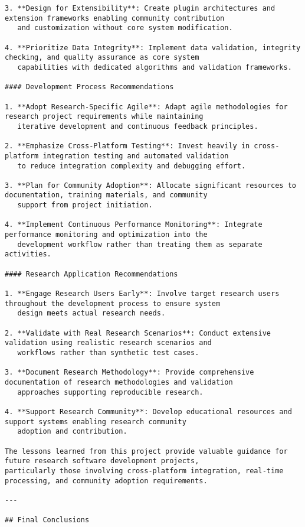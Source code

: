 \documentclass[12pt,a4paper]{report}
\begin{document}
\begin{verbatim}
3. **Design for Extensibility**: Create plugin architectures and extension frameworks enabling community contribution
   and customization without core system modification.

4. **Prioritize Data Integrity**: Implement data validation, integrity checking, and quality assurance as core system
   capabilities with dedicated algorithms and validation frameworks.

#### Development Process Recommendations

1. **Adopt Research-Specific Agile**: Adapt agile methodologies for research project requirements while maintaining
   iterative development and continuous feedback principles.

2. **Emphasize Cross-Platform Testing**: Invest heavily in cross-platform integration testing and automated validation
   to reduce integration complexity and debugging effort.

3. **Plan for Community Adoption**: Allocate significant resources to documentation, training materials, and community
   support from project initiation.

4. **Implement Continuous Performance Monitoring**: Integrate performance monitoring and optimization into the
   development workflow rather than treating them as separate activities.

#### Research Application Recommendations

1. **Engage Research Users Early**: Involve target research users throughout the development process to ensure system
   design meets actual research needs.

2. **Validate with Real Research Scenarios**: Conduct extensive validation using realistic research scenarios and
   workflows rather than synthetic test cases.

3. **Document Research Methodology**: Provide comprehensive documentation of research methodologies and validation
   approaches supporting reproducible research.

4. **Support Research Community**: Develop educational resources and support systems enabling research community
   adoption and contribution.

The lessons learned from this project provide valuable guidance for future research software development projects,
particularly those involving cross-platform integration, real-time processing, and community adoption requirements.

---

## Final Conclusions


\end{verbatim}
\end{document}
